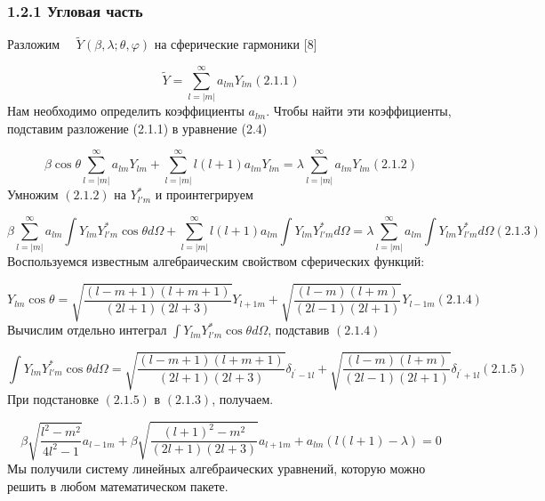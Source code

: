 \documentclass[a4paper]{article}
\begin{document}
\subsubsection[1.2.1 Угловая часть]{1.2.1
Угловая часть}
\hypertarget{RefHeading4675463868395}{}Разложим \ \  $\widetilde
Y(\beta ,\lambda ;\theta ,\varphi )$ на
сферические гармоники [8]

\begin{equation*}
\widetilde Y=\sum _{l=|m|}^{{\infty}}a_{\mathit{lm}}Y_{\mathit{lm}}(2.1.1)
\end{equation*}
Нам необходимо определить
коэффициенты  $a_{\mathit{lm}}$.
Чтобы найти эти коэффициенты, подставим разложение (2.1.1) в уравнение (2.4)

\begin{equation*}
\beta \cos \theta \sum _{l=|m|}^{{\infty}}a_{\mathit{lm}}Y_{\mathit{lm}}+\sum _{l=| m|
}^{{\infty}}l(l+1)a_{\mathit{lm}}Y_{\mathit{lm}}=\lambda \sum _{l=| m|
}^{{\infty}}a_{\mathit{lm}}Y_{\mathit{lm}}(2.1.2)
\end{equation*}
Умножим  $(2.1.2)$ на  $Y_{l'm}^{\ast }$ и
проинтегрируем

\begin{equation*}
\beta \sum _{l=| m| }^{{\infty}}a_{\mathit{lm}}\int Y_{\mathit{lm}}Y_{l'm}^{\ast }\cos \theta \mathit{d\Omega
}+\sum _{l=| m| }^{{\infty}}l(l+1)a_{\mathit{lm}}\int Y_{\mathit{lm}}Y_{l'm}^{\ast }\mathit{d\Omega }=\lambda
\sum _{l=| m| }^{{\infty}}a_{\mathit{lm}}\int Y_{\mathit{lm}}Y_{l'm}^{\ast }\mathit{d\Omega }(2.1.3)
\end{equation*}
Воспользуемся известным алгебраическим свойством сферических функций:

\begin{equation*}
Y_{\mathit{lm}}\cos \theta
=\sqrt{\frac{(l-m+1)(l+m+1)}{\left(2l+1\right)(2l+3)}}Y_{l+1m}+\sqrt{\frac{(l-m)(l+m)}{\left(2l-1\right)(2l+1)}}Y_{l-1m}(2.1.4)
\end{equation*}
Вычислим отдельно
интеграл  $\int Y_{\mathit{lm}}Y_{l'm}^{\ast }\cos \theta
\mathit{d\Omega }$, подставив  $(2.1.4)$

\begin{equation*}
\int Y_{\mathit{lm}}Y_{l'm}^{\ast }\cos \theta \mathit{d\Omega
}=\sqrt{\frac{(l-m+1)(l+m+1)}{\left(2l+1\right)(2l+3)}}\delta
_{l^{'}-1l}+\sqrt{\frac{(l-m)(l+m)}{\left(2l-1\right)(2l+1)}}\delta _{l^{'}+1l}(2.1.5)
\end{equation*}
При подстановке  $(2.1.5)$ в
$(2.1.3)$, получаем.

\begin{equation*}
\beta \sqrt{\frac{l^2-m^2}{4l^2-1}}a_{l-1m}+\beta
\sqrt{\frac{\left(l+1\right)^2-m^2}{\left(2l+1\right)(2l+3)}}a_{l+1m}+a_{\mathit{lm}}\left(l\left(l+1\right)-\lambda
\right)=0
\end{equation*}
Мы получили систему линейных алгебраических уравнений, которую можно решить в любом математическом пакете.
\end{document}
